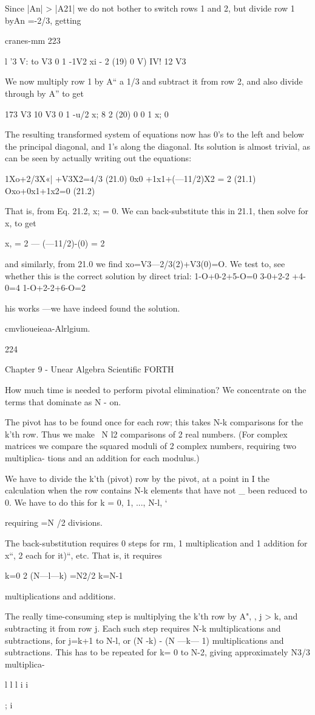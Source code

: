 {Since |An| > |A21| we do not bother to switch rows 1 and 2, but
divide row 1 byAn =-2/3, getting

cranes-mm 223

l ’3 V: to V3
0 1 -1V2 xi - 2 (19)
0 V) IV! 12 V3

 

 

 

 

We now multiply row 1 by A“ a 1/3 and subtract it from row 2,
and also divide through by A” to get

173 V3 10 V3
0 1 -u/2 x; 8 2 (20)
0 0 1 x; 0

 

The resulting transformed system of equations now has 0’s to the
left and below the principal diagonal, and 1's along the diagonal.
Its solution is almost trivial, as can be seen by actually writing out
the equations:

1Xo+2/3X«| +V3X2=4/3 (21.0)
0x0 +1x1+(—11/2)X2 = 2 (21.1)
Oxo+0x1+1x2=0 (21.2)

That is, from Eq. 21.2, x; = 0. We can back-substitute this in 21.1,
then solve for x, to get

x, = 2 — (—11/2)-(0) = 2

and similarly, from 21.0 we ﬁnd
xo=V3—2/3(2)+V3(0)=O.
We test to, see whether this is the correct solution by direct trial:
1-O+0-2+5-O=0
3-0+2-2 +4-0=4
1-O+2-2+6-O=2

his works —we have indeed found the solution.

cmvlioueieaa-Alrlgium.

224

Chapter 9 - Unear Algebra Scientiﬁc FORTH

How much time is needed to perform pivotal elimination? We
concentrate on the terms that dominate as N - on.

The pivot has to be found once for each row; this takes N-k
comparisons for the k’th row. Thus we make ~N l2 comparisons
of 2 real numbers. (For complex matrices we compare the
squared moduli of 2 complex numbers, requiring two multiplica-
tions and an addition for each modulus.)

We have to divide the k’th (pivot) row by the pivot, at a point in I
the calculation when the row contains N-k elements that have not _
been reduced to 0. We have to do this for k = 0, 1, ..., N-l, ‘

requiring =N /2 divisions.

The back-substitution requires 0 steps for rm, 1 multiplication
and 1 addition for x“, 2 each for it)“, etc. That is, it requires

k=0
2 (N—l—k) =N2/2
k=N-1

multiplications and additions.

The really time-consuming step is multiplying the k’th row by
A", , j > k, and subtracting it from row j. Each such step requires
N-k multiplications and subtractions, for j=k+1 to N-l, or
(N -k) - (N —k— 1) multiplications and subtractions. This has to be
repeated for k= 0 to N-2, giving approximately N3/3 multiplica-

 

l
l
l
i
i}
;
i


